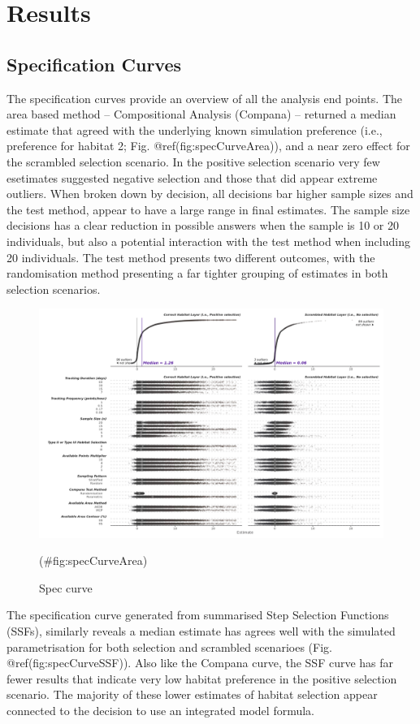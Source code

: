 \documentclass[10pt,a4paper]{article}
\begin{document}
\section{Results}\label{results}

\subsection{Specification Curves}\label{specification-curves}

The specification curves provide an overview of all the analysis end points.
The area based method -- Compositional Analysis (Compana) -- returned a median estimate that agreed with the underlying known simulation preference (i.e., preference for habitat 2; Fig. @ref(fig:specCurveArea)), and a near zero effect for the scrambled selection scenario.
In the positive selection scenario very few esetimates suggested negative selection and those that did appear extreme outliers.
When broken down by decision, all decisions bar higher sample sizes and the test method, appear to have a large range in final estimates.
The sample size decisions has a clear reduction in possible answers when the sample is 10 or 20 individuals, but also a potential interaction with the test method when including 20 individuals.
The test method presents two different outcomes, with the randomisation method presenting a far tighter grouping of estimates in both selection scenarios.

\begin{figure}
\includegraphics[width=1\linewidth]{../figures/area_specCurve} \caption{Spec curve}(\#fig:specCurveArea)
\end{figure}

The specification curve generated from summarised Step Selection Functions (SSFs), similarly reveals a median estimate has agrees well with the simulated parametrisation for both selection and scrambled scenarioes (Fig. @ref(fig:specCurveSSF)).
Also like the Compana curve, the SSF curve has far fewer results that indicate very low habitat preference in the positive selection scenario.
The majority of these lower estimates of habitat selection appear connected to the decision to use an integrated model formula.
\end{document}
